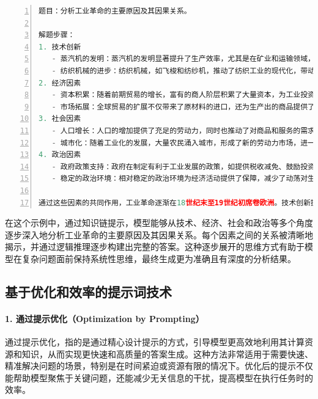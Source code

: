 \begin{lstlisting}[language={python},label={},caption={}, basicstyle=\footnotesize\ttfamily, breaklines=true, numbers=left, frame=single]
题目：分析工业革命的主要原因及其因果关系。

解题步骤：
1. 技术创新
   - 蒸汽机的发明：蒸汽机的发明显著提升了生产效率，尤其是在矿业和运输领域，改变了人类对能源的使用方式。
   - 纺织机械的进步：纺织机械，如飞梭和纺纱机，推动了纺织工业的现代化，带动了大规模的生产。
2. 经济因素
   - 资本积累：随着前期贸易的增长，富有的商人阶层积累了大量资本，为工业投资提供了必要的资金支持。
   - 市场拓展：全球贸易的扩展不仅带来了原材料的进口，还为生产出的商品提供了庞大的市场。
3. 社会因素
   - 人口增长：人口的增加提供了充足的劳动力，同时也推动了对商品和服务的需求。
   - 城市化：随着工业化的发展，大量农民涌入城市，形成了新的劳动力市场，进一步促进了工业的集中和扩张。
4. 政治因素
   - 政府政策支持：政府在制定有利于工业发展的政策，如提供税收减免、鼓励投资等方面起到了关键作用。
   - 稳定的政治环境：相对稳定的政治环境为经济活动提供了保障，减少了动荡对生产和贸易的干扰。

通过这些因素的共同作用，工业革命逐渐在18世纪末至19世纪初席卷欧洲。技术创新提高了生产效率，经济因素提供了资金和市场支持，社会因素为工业提供了劳动力，并促进了城市化的进程，而政府的政策支持和政治稳定则为这一切提供了保障。所有这些因素相互作用，推动了工业革命的历史进程。
\end{lstlisting}

在这个示例中，通过知识链提示，模型能够从技术、经济、社会和政治等多个角度逐步深入地分析工业革命的主要原因及其因果关系。每个因素之间的关系被清晰地揭示，并通过逻辑推理逐步构建出完整的答案。这种逐步展开的思维方式有助于模型在复杂问题面前保持系统性思维，最终生成更为准确且有深度的分析结果。

\subsection{基于优化和效率的提示词技术}

\paragraph{1. 通过提示优化（Optimization by Prompting）} 

通过提示优化，指的是通过精心设计提示的方式，引导模型更高效地利用其计算资源和知识，从而实现更快速和高质量的答案生成。这种方法非常适用于需要快速、精准解决问题的场景，特别是在时间紧迫或资源有限的情况下。优化后的提示不仅能帮助模型聚焦于关键问题，还能减少无关信息的干扰，提高模型在执行任务时的效率。

